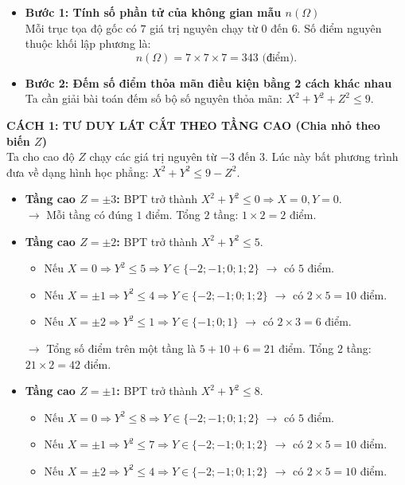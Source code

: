 \begin{ex}
{		\begin{itemize}
			\item \textbf{Bước 1: Tính số phần tử của không gian mẫu $n(\Omega)$}\\
			Mỗi trục tọa độ gốc có $7$ giá trị nguyên chạy từ $0$ đến $6$. Số điểm nguyên thuộc khối lập phương là:
			\[ n(\Omega) = 7 \times 7 \times 7 = 343 \text{ (điểm)}.\]
			\item \textbf{Bước 2: Đếm số điểm thỏa mãn điều kiện bằng 2 cách khác nhau}\\
			Ta cần giải bài toán đếm số bộ số nguyên thỏa mãn: $X^2 + Y^2 + Z^2 \le 9$.
		\end{itemize}
		\textbf{CÁCH 1: TƯ DUY LÁT CẮT THEO TẦNG CAO (Chia nhỏ theo biến $Z$)}
		\\ Ta cho cao độ $Z$ chạy các giá trị nguyên từ $-3$ đến $3$. Lúc này bất phương trình đưa về dạng hình học phẳng: $X^2 + Y^2 \le 9 - Z^2$.
		\begin{itemize}
			\item \textbf{Tầng cao $Z = \pm 3$:} BPT trở thành $X^2 + Y^2 \le 0 \Rightarrow X=0, Y=0$.
			\\ $\rightarrow$ Mỗi tầng có đúng $1$ điểm. Tổng $2$ tầng: $1 \times 2 = 2$ điểm.
			\item \textbf{Tầng cao $Z = \pm 2$:} BPT trở thành $X^2 + Y^2 \le 5$.
			\begin{itemize}
				\item Nếu $X = 0 \Rightarrow Y^2 \le 5 \Rightarrow Y \in \{-2; -1; 0; 1; 2\}$ $\rightarrow$ có $5$ điểm.
				\item Nếu $X = \pm 1 \Rightarrow Y^2 \le 4 \Rightarrow Y \in \{-2; -1; 0; 1; 2\}$ $\rightarrow$ có $2 \times 5 = 10$ điểm.
				\item Nếu $X = \pm 2 \Rightarrow Y^2 \le 1 \Rightarrow Y \in \{-1; 0; 1\}$ $\rightarrow$ có $2 \times 3 = 6$ điểm.
			\end{itemize}
			$\rightarrow$ Tổng số điểm trên một tầng là $5 + 10 + 6 = 21$ điểm. Tổng $2$ tầng: $21 \times 2 = 42$ điểm.
			\item \textbf{Tầng cao $Z = \pm 1$:} BPT trở thành $X^2 + Y^2 \le 8$.
			\begin{itemize}
				\item Nếu $X = 0 \Rightarrow Y^2 \le 8 \Rightarrow Y \in \{-2; -1; 0; 1; 2\}$ $\rightarrow$ có $5$ điểm.
				\item Nếu $X = \pm 1 \Rightarrow Y^2 \le 7 \Rightarrow Y \in \{-2; -1; 0; 1; 2\}$ $\rightarrow$ có $2 \times 5 = 10$ điểm.
				\item Nếu $X = \pm 2 \Rightarrow Y^2 \le 4 \Rightarrow Y \in \{-2; -1; 0; 1; 2\}$ $\rightarrow$ có $2 \times 5 = 10$ điểm.

\end{itemize}
\end{itemize}}
\end{ex}
